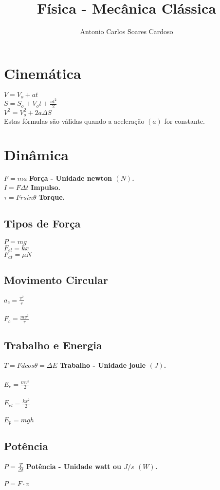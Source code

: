 \documentclass[
    12pt, %
    openright,
    twoside, %
    a4paper, %
    article,
    english,brazil %
]{abntex2}
\author{Antonio Carlos Soares Cardoso}
\title{Física - Mecânica Clássica}
\makeatletter
\renewcommand\tableofcontents{%
  \null\hfill\textbf{\Large\contentsname}\hfill\null\par
  \@mkboth{\MakeUppercase\contentsname}{\MakeUppercase\contentsname}%
  \@starttoc{toc}%
}
\makeatother
\begin{document}
\tableofcontents

\newpage

\textual

\noindent

\section{Cinemática}

$V = V_o + at$ \\
$S = S_o + V_ot + \frac{at^2}{2}$ \\
$V^2 = V_o^2 + 2a\Delta S$ \\

Estas fórmulas são válidas quando a aceleração $(a)$ for constante.

\section{Dinâmica}

$F = ma$ \quad \textbf{Força - Unidade newton $(N)$.} \\
$I = F\Delta t$ \quad \textbf{Impulso.} \\
$\tau = Frsin\theta$ \quad \textbf{Torque.} \\

\subsection{Tipos de Força} 

$P = mg$ \\
$F_{el} = kx$ \\
$F_{at} = \mu N$ \\

\subsection{Movimento Circular}

$a_c = \frac{v^2}{r}$ \\
\\
$F_c = \frac{mv^2}{r}$ \\

\subsection{Trabalho e Energia}

$T = Fdcos\theta = \Delta E$ \quad \textbf{Trabalho - Unidade joule $(J)$.} \\
\\
$E_c = \frac{mv^2}{2}$ \\
\\
$E_{el} = \frac{kx^2}{2}$ \\
\\
$E_{p} = mgh$ \\

\subsection{Potência}

$P = \frac{T}{\Delta t}$ \quad \textbf{Potência - Unidade watt ou $J/s$ $(W)$.} \\
\\
$P = F \cdot v$ \\
\end{document}
